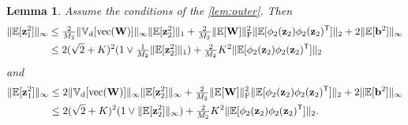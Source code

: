 \documentclass[twoside]{article}
\renewcommand{\ss}[1]{_{\text{#1}}}
\newcommand{\vb}{\mathbf{b}}
\newcommand{\vz}{\mathbf{z}}
\newcommand{\mW}{\mathbf{W}}
\newcommand{\E}{\mathbb{E}}
\newcommand{\V}{\mathbb{V}}
\newcommand{\T}{\text{\textsf{T}}}
\renewcommand{\ss}[1]{_{\text{#1}}}        %
\DeclarePairedDelimiter\norm{\|}{\|}             %
\theoremstyle{theoremstyle}
\newtheorem{lemma}[theorem]{Lemma}
\begin{document}
\begin{lemma} \label{lem:inf}     Assume the conditions of the \cref{lem:outer}.
    Then
    \begin{align}
        \norm{\E[\vz_1^2]}_\infty 
        &\le \tfrac2{M_2} \norm{\V\ss{d}[\operatorname{vec}(\mW)]}_\infty \norm{\E[\vz_{2}^2]}_1
        + \tfrac2{M_2} \norm{\E[\mW]}\ss{F}^2 \norm{\E[\phi_2(\vz_{2})\phi_2(\vz_{2})^\T]}_2
        + 2 \norm{\E[\vb^2]}_\infty \label{eqn:lem-outer-part1}\\
        &\le
            2(\sqrt{2}+K)^2 (1 \lor \tfrac1{M_2} \norm{\E[\vz_{2}^2]}_1)
            + \tfrac2{M_2} K^2 \norm{\E[\phi_2(\vz_{2})\phi_2(\vz_{2})^\T]}_2
    \end{align}
    and
    \begin{align}
        \norm{\E[\vz_1^2]}_\infty 
        &\le 2 \norm{\V\ss{d}[\operatorname{vec}(\mW)]}_\infty \norm{\E[\vz_{2}^2]}_\infty
        + \tfrac2{M_2} \norm{\E[\mW]}\ss{F}^2 \norm{\E[\phi_2(\vz_{2})\phi_2(\vz_{2})^\T]}_2
        + 2 \norm{\E[\vb^2]}_\infty \label{eqn:lem-outer-part2} \\
        &\le
            2(\sqrt{2}+K)^2 (1 \lor \norm{\E[\vz_{2}^2]}_\infty)
            + \tfrac2{M_2} K^2 \norm{\E[\phi_2(\vz_{2})\phi_2(\vz_{2})^\T]}_2.
    \end{align}
\end{lemma}
\end{document}
